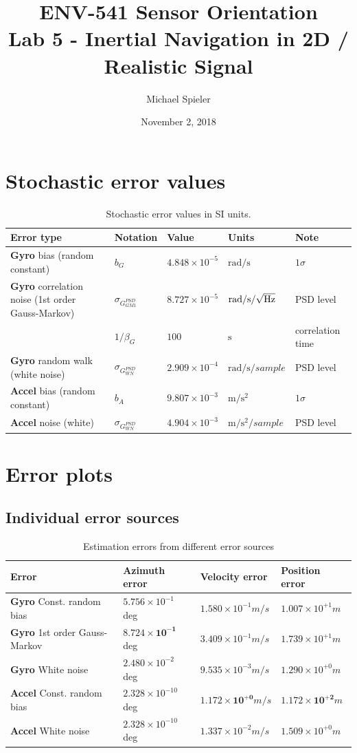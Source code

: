 \documentclass{article}
\title{ENV-541 Sensor Orientation\\Lab 5 - Inertial Navigation in 2D / Realistic Signal}
\author{Michael Spieler}
\date{November 2, 2018}
\newcommand{\e}[1]{\times 10^{#1}} %
\begin{document}
\maketitle

\section*{Stochastic error values}

\begin{table}[h]
\centering
\begin{tabular}{lllll}
Error type & Notation & Value & Units & Note \\
\hline
\textbf{Gyro} bias (random constant) & $b_G$ & $4.848\e{-5}$ & $\si{\radian/\second}$ & $1\sigma$ \\
\textbf{Gyro} correlation noise (1st order Gauss-Markov) & $\sigma_{G^{PSD}_{GM1}}$ & $8.727\e{-5}$ & $\si{\radian/\second/\sqrt{\hertz}}$ & PSD level \\
& $1/\beta_G$ & $100$ & $\si{\second}$ & correlation time \\
\textbf{Gyro} random walk (white noise) & $\sigma_{G^{PSD}_{WN}}$  & $2.909\e{-4}$ & $\si{\radian/\second/sample}$ & PSD level \\
\textbf{Accel} bias (random constant) & $b_A$  & $9.807 \e{-3}$ & $\si{\meter/\second^2}$ & $1\sigma$ \\
\textbf{Accel} noise (white)  & $\sigma_{G^{PSD}_{WN}}$ & $4.904\e{-3}$ & $\si{\meter/\second^2/sample}$ & PSD level
\end{tabular}
\caption{Stochastic error values in SI units.}
\label{tab:err_val}
\end{table}

\section*{Error plots}

\subsection*{Individual error sources}

\begin{table}[h]
\centering
\begin{tabular}{llll}
Error  & Azimuth error & Velocity error & Position error \\
\hline
\textbf{Gyro} Const. random bias & $5.756\e{-1}$ deg & $1.580\e{-1} \si{m/s}$ & $1.007\e{+1} \si{m}$ \\
\textbf{Gyro} 1st order Gauss-Markov & $\mathbf{8.724\e{-1}}$ deg & $3.409\e{-1} \si{m/s}$ & $1.739\e{+1} \si{m}$ \\
\textbf{Gyro} White noise & $2.480\e{-2}$ deg & $9.535\e{-3} \si{m/s}$ & $1.290\e{+0} \si{m}$ \\
\hline
\textbf{Accel} Const. random bias & $2.328\e{-10}$ deg & $\mathbf{1.172\e{+0}} \si{m/s}$ & $\mathbf{1.172\e{+2}} \si{m}$ \\
\textbf{Accel} White noise & $2.328\e{-10}$ deg & $1.337\e{-2} \si{m/s}$ & $1.509\e{+0} \si{m}$ 
\end{tabular}
\caption{Estimation errors from different error sources}
\label{tab:err_result}
\end{table}
\end{document}
